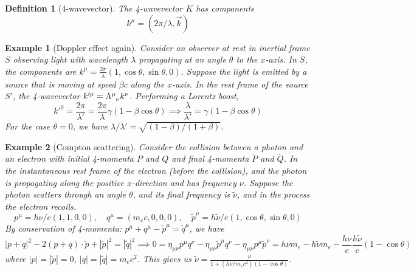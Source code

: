 \documentclass[a4paper]{article}
\newtheorem{eg}{Example}[section]
\theoremstyle{new}
\newtheorem{defi}{Definition}[section]
\begin{document}
\begin{defi}[4-wavevector]
The 4-wavevector $K$ has components
\begin{equation}
k^\mu=(2\pi/\lambda,\vec{k})\label{4-wavevector}
\end{equation}
\end{defi}
\begin{eg}[Doppler effect again]
Consider an observer at rest in inertial frame $S$ observing light with wavelength $\lambda$ propagating at an angle $\theta$ to the $x$-axis. In $S$, the components are $k^\mu=\frac{2\pi}{\lambda}(1,\cos\theta,\sin\theta,0)$. Suppose the light is emitted by a source that is moving at speed $\beta c$ along the $x$-axis. In the rest frame of the source $S'$, the 4-wavevector $k'^\mu=\tensor*{\Lambda}{*_{}^{\mu}_{\nu}}k^\nu$. Performing a Lorentz boost,
$$k'^0=\frac{2\pi}{\lambda'}=\frac{2\pi}{\lambda}\gamma(1-\beta\cos\theta)\implies\frac{\lambda}{\lambda'}=\gamma(1-\beta\cos\theta)$$
For the case $\theta=0$, we have $\lambda/\lambda'=\sqrt{(1-\beta)/(1+\beta)}$.
\end{eg}
\begin{eg}[Compton scattering]
Consider the collision between a photon and an electron with initial 4-momenta $P$ and $Q$ and final 4-momenta $\tilde{P}$ and $\tilde{Q}$. In the instantaneous rest frame of the electron (before the collision), and the photon is propagating along the positive $x$-direction and has frequency $\nu$. Suppose the photon scatters through an angle $\theta$, and its final frequency is $\tilde{\nu}$, and in the process the electron recoils. $$p^\mu=h\nu/c(1,1,0,0),\quad q^\mu=(m_ec,0,0,0),\quad\tilde{p}^\mu=h\tilde{\nu}/c(1,\cos\theta,\sin\theta,0)$$
By conservation of 4-momenta: $p^\mu+q^\mu-\tilde{p}^\mu=\tilde{q}^\mu$, we have
$$|p+q|^2-2(p+q)\cdot\tilde{p}+|\tilde{p}|^2=|\tilde{q}|^2\implies0=\eta_{\mu\nu}p^\mu q^\nu-\eta_{\mu\nu}\tilde{p}^\mu q^\nu-\eta_{\mu\nu}p^\mu\tilde{p}^\nu=h\nu m_e-h\tilde{\nu}m_e-\frac{h\nu}{c}\frac{h\tilde{\nu}}{c}(1-\cos\theta)$$
where $|p|=|\tilde{p}|=0$, $|q|=|\tilde{q}|=m_ec^2$. This gives us $\tilde{\nu}=\frac{\nu}{1+(h\nu/m_ec^2)(1-\cos\theta)}$. 
\end{eg}
\end{document}
